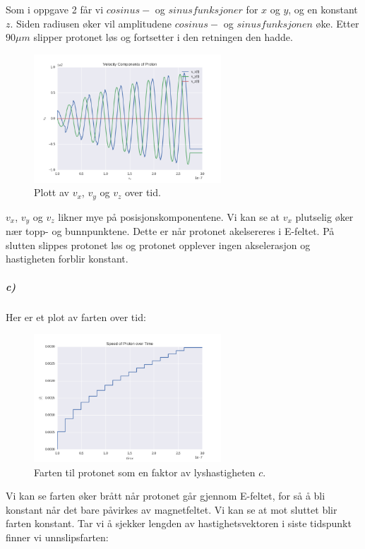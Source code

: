 \documentclass[a4paper,norsk, 10pt]{article}
\begin{document}
Som i oppgave 2 får vi $cosinus-$ og $sinusfunksjoner$ for $x$ og $y$, og en konstant $z$. Siden radiusen øker vil amplitudene $cosinus-$ og $sinusfunksjonen$ øke. Etter $90 \mu m$ slipper protonet løs og fortsetter i den retningen den hadde.

\begin{figure}[H]
\begin{center}
\includegraphics[width = 70mm]{opp3bVelKomp.png}
\caption{Plott av $v_x$, $v_y$ og $v_z$ over tid.}
\end{center}
\end{figure}

$v_x$, $v_y$ og $v_z$ likner mye på posisjonskomponentene. Vi kan se at $v_x$ plutselig øker nær topp- og bunnpunktene. Dette er når protonet akelsereres i E-feltet. På slutten slippes protonet løs og protonet opplever ingen akselerasjon og hastigheten forblir konstant.


\subparagraph*{c)}

Her er et plot av farten over tid:

\begin{figure}[H]
\begin{center}
\includegraphics[width = 70mm]{opp3bSpeed.png}
\caption{Farten til protonet som en faktor av lyshastigheten $c$.}
\end{center}
\end{figure}

Vi kan se farten øker brått når protonet går gjennom E-feltet, for så å bli konstant når det bare påvirkes av magnetfeltet. Vi kan se at mot sluttet blir farten konstant. Tar vi å sjekker lengden av hastighetsvektoren i siste tidspunkt finner vi unnslipsfarten:
\end{document}
